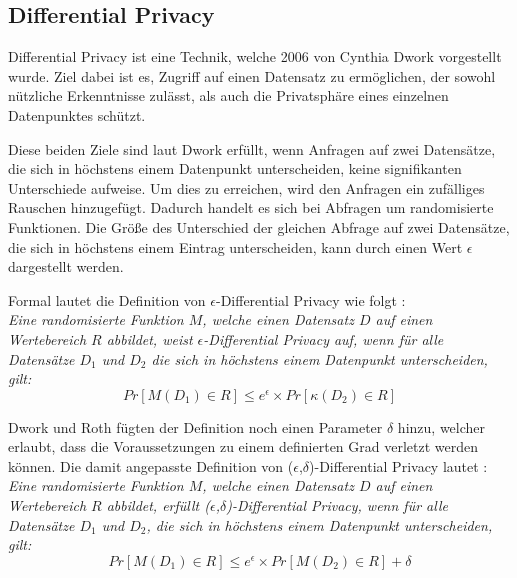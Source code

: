 \subsection{Differential Privacy}

Differential Privacy ist eine Technik, welche 2006 von Cynthia Dwork \cite{P-26} vorgestellt wurde.
Ziel dabei ist es, Zugriff auf einen Datensatz zu ermöglichen, der sowohl nützliche Erkenntnisse zulässt, als auch die Privatsphäre eines einzelnen Datenpunktes schützt.


Diese beiden Ziele sind laut Dwork \cite{P-26} erfüllt, wenn Anfragen auf zwei Datensätze, die sich in höchstens einem Datenpunkt unterscheiden, keine signifikanten Unterschiede aufweise. 
Um dies zu erreichen, wird den Anfragen ein zufälliges Rauschen hinzugefügt. 
Dadurch handelt es sich bei Abfragen um randomisierte Funktionen.
Die Größe des Unterschied der gleichen Abfrage auf zwei Datensätze, die sich in höchstens einem Eintrag unterscheiden, kann durch einen Wert $\epsilon$ dargestellt werden.

Formal lautet die Definition von $\epsilon$-Differential Privacy wie folgt \cite{P-26}:\\
\textit{
Eine randomisierte Funktion $M$, welche einen Datensatz $D$ auf einen Wertebereich $R$ abbildet, weist $\epsilon$-Differential Privacy auf, wenn für alle Datensätze $D_{1}$ und $D_{2}$ die sich in höchstens einem Datenpunkt unterscheiden, gilt:}
\begin{equation}
    Pr[M(D_{1}) \in R] \leq e^{\epsilon} \times Pr[\kappa(D_{2}) \in R]
\end{equation}

Dwork und Roth \cite{P-27} fügten der Definition noch einen Parameter $\delta$ hinzu, welcher erlaubt, dass die Voraussetzungen zu einem definierten Grad verletzt werden können.
Die damit angepasste Definition von ($\epsilon$,$\delta$)-Differential Privacy lautet \cite{P-27}:\\
\textit{
    Eine randomisierte Funktion $M$, welche einen Datensatz $D$ auf einen Wertebereich $R$ abbildet, erfüllt ($\epsilon$,$\delta$)-Differential Privacy, wenn für alle Datensätze $D_{1}$ und $D_{2}$, die sich in höchstens einem Datenpunkt unterscheiden, gilt:}
\begin{equation}
    Pr[M(D_{1}) \in R] \leq e^{\epsilon} \times Pr[M(D_{2}) \in R] + \delta
\end{equation} 

